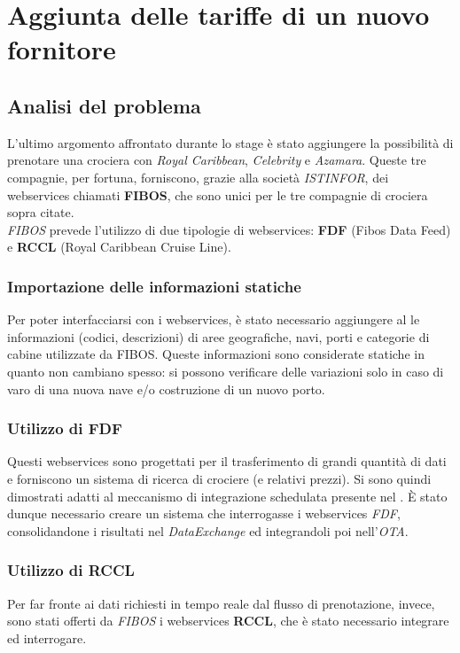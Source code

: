 \section{Aggiunta delle tariffe di un nuovo fornitore}
\subsection{Analisi del problema}
L'ultimo argomento affrontato durante lo stage è stato aggiungere la possibilità di prenotare una crociera con \textit{Royal Caribbean}, \textit{Celebrity} e \textit{Azamara}. Queste tre compagnie, per fortuna, forniscono, grazie alla società \textit{ISTINFOR}, dei \glspl{webservice} chiamati \textbf{FIBOS}, che sono unici per le tre compagnie di crociera sopra citate. \\
\textit{FIBOS} prevede l'utilizzo di due tipologie di \glspl{webservice}: \textbf{FDF} (Fibos Data Feed) e \textbf{RCCL} (Royal Caribbean Cruise Line).
\subsubsection{Importazione delle informazioni statiche}
Per poter interfacciarsi con i \glspl{webservice}, è stato necessario aggiungere al \bookingEngine\hphantom{i}le informazioni (codici, descrizioni) di aree geografiche, navi, porti e categorie di cabine utilizzate da FIBOS. Queste informazioni sono considerate statiche in quanto non cambiano spesso: si possono verificare delle variazioni solo in caso di varo di una nuova nave e/o costruzione di un nuovo porto.

\subsubsection{Utilizzo di FDF}
Questi \glspl{webservice} sono progettati per il trasferimento di grandi quantità di dati e forniscono un sistema di ricerca di crociere (e relativi prezzi). Si sono quindi dimostrati adatti al meccanismo di integrazione schedulata presente nel \bookingEngine. È stato dunque necessario creare un sistema che interrogasse i \glspl{webservice} \textit{FDF}, consolidandone i risultati nel \textit{DataExchange} ed integrandoli poi nell'\textit{OTA}. 

\subsubsection{Utilizzo di RCCL}
Per far fronte ai dati richiesti in tempo reale dal flusso di prenotazione, invece, sono stati offerti da \textit{FIBOS} i \glspl{webservice} \textbf{RCCL}, che è stato necessario integrare ed interrogare.

